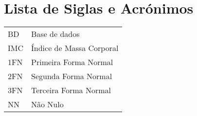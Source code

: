\documentclass[a4paper, twoside]{report}
\begin{document}
\tableofcontents
\listoffigures
\listoftables








\chapter*{Lista de Siglas e Acrónimos}
\begin{table}[h]
    \begin{tabular}{ll}
    BD  & Base de dados \\
    IMC & Índice de Massa Corporal \\
    1FN & Primeira Forma Normal\\
    2FN & Segunda Forma Normal\\
    3FN & Terceira Forma Normal\\
    NN  & Não Nulo
    \end{tabular}
\end{table}





\end{document}
